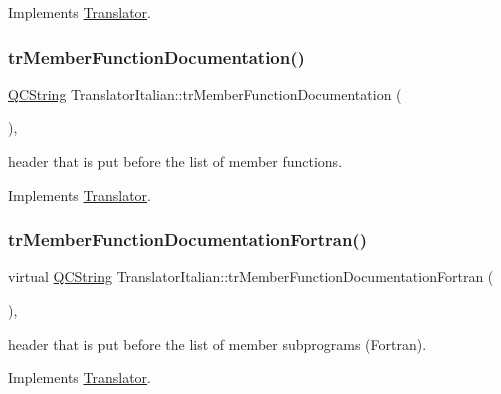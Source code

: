 Implements \mbox{\hyperlink{class_translator}{Translator}}.

\mbox{\label{class_translator_italian_ac61a2916232c9c2350aee95d20f0f368}} 
\subsubsection{\texorpdfstring{trMemberFunctionDocumentation()}{trMemberFunctionDocumentation()}}
{\footnotesize\ttfamily \mbox{\hyperlink{class_q_c_string}{Q\+C\+String}} Translator\+Italian\+::tr\+Member\+Function\+Documentation (\begin{DoxyParamCaption}{ }\end{DoxyParamCaption})\hspace{0.3cm}{\ttfamily [inline]}, {\ttfamily [virtual]}}

header that is put before the list of member functions. 

Implements \mbox{\hyperlink{class_translator}{Translator}}.

\mbox{\label{class_translator_italian_a328b5e0aa818391336e3cd8dcaef3420}} 
\subsubsection{\texorpdfstring{trMemberFunctionDocumentationFortran()}{trMemberFunctionDocumentationFortran()}}
{\footnotesize\ttfamily virtual \mbox{\hyperlink{class_q_c_string}{Q\+C\+String}} Translator\+Italian\+::tr\+Member\+Function\+Documentation\+Fortran (\begin{DoxyParamCaption}{ }\end{DoxyParamCaption})\hspace{0.3cm}{\ttfamily [inline]}, {\ttfamily [virtual]}}

header that is put before the list of member subprograms (Fortran). 

Implements \mbox{\hyperlink{class_translator}{Translator}}.

